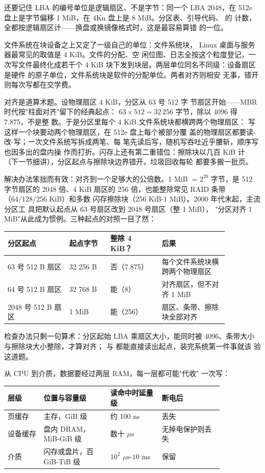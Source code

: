 还要记住 LBA 的编号单位是逻辑扇区、不是字节：同一个
LBA 2048，在 512e 盘上是字节偏移 1 MiB，在 4Kn 盘上是
8 MiB。分区表、引导代码、 的  计数，
全都按逻辑扇区计——换盘或换镜像格式时，这是最容易算错
的一位。

文件系统在块设备之上又定了一级自己的单位：文件系统块，
Linux 桌面与服务器最常见的取值是 4 KiB。文件的分配、空
闲位图、日志全按这个粒度登记，一次写文件最终化成若干个
4 KiB 块下发到块层。两层单位同名不同级：设备扇区是硬件
的原子单位，文件系统块是软件的分配单位。两者对齐则相安
无事，错开则每次写都在交学费。

对齐是道算术题。设物理扇区 4 KiB，分区从 63 号 512 字
节扇区开始——MBR 时代按"柱面对齐"留下的经典起点：
$63\times512=32\,256$ 字节，除以 4096 得 7.875，不是整
数。于是分区里每个 4 KiB 文件系统块都横跨两个物理扇区：
写这样一个块要动两个物理扇区，在 512e 盘上每个被部分覆
盖的物理扇区都要读-改-写；一次文件系统写拆成两笔、每
笔先读后写，随机写吞吐近乎腰斩，顺序写也因多出的盘内操
作而打折。闪存上还有第二重错位：擦除块以几百 KiB 计
（下一节细讲），分区起点与擦除块边界错开，垃圾回收每轮
都要多搬一批页。

解决办法笨拙而有效：对齐到一个足够大的公倍数。1 MiB
$=2^{20}$ 字节，是 512 字节扇区的 2048 倍、4 KiB 扇区的
256 倍，也能整除常见 RAID 条带（64/128/256 KiB）和多数
闪存擦除块（256 KiB-1 MiB）。2000 年代末起，主流分区工
具把默认起点从 63 号扇区改到 2048 号扇区（整 1 MiB），
"分区对齐 1 MiB"从此成为惯例。三种起点的对照一目了然：

\begin{longtable}{L{0.24\linewidth}L{0.16\linewidth}L{0.2\linewidth}L{0.26\linewidth}}
\toprule
分区起点 & 起点字节 & 整除 4 KiB？ & 后果 \\
 号 512 B 扇区 & 32 256 B & 否（7.875） & 每个文件系统块横跨两个物理扇区 \\
64 号 512 B 扇区 & 32 768 B & 能（8） & 对齐扇区，但不对齐 1 MiB \\
2048 号 512 B 扇区 & 1 MiB & 能（256） & 扇区、条带、擦除块全部对齐 \\
\bottomrule
\end{longtable}

检查办法只剩一句算术：分区起始 LBA 乘扇区大小，能同时被
4096、条带大小与擦除块大小整除，才算对齐；
与  都能直接读出起点，装完系统第一件事就该
验这道题。

从 CPU 到介质，数据要经过两层 RAM，每一层都可能"代收"
一次写：

\begin{longtable}{L{0.14\linewidth}L{0.26\linewidth}L{0.2\linewidth}L{0.24\linewidth}}
\toprule
层级 & 位置与容量级 & 读命中时延量级 & 断电后 \\
\midrule
页缓存 & 主存，GiB 级 & 约 100 ns & 丢失 \\
设备缓存 & 盘内 DRAM，MiB-GiB 级 & 数十 $\mu$s & 无掉电保护则丢失 \\
介质 & 闪存或盘片，百 GiB-TiB 级 & $10^{2}$ $\mu$s-$10$ ms & 保留 \\
\bottomrule
\end{longtable}

